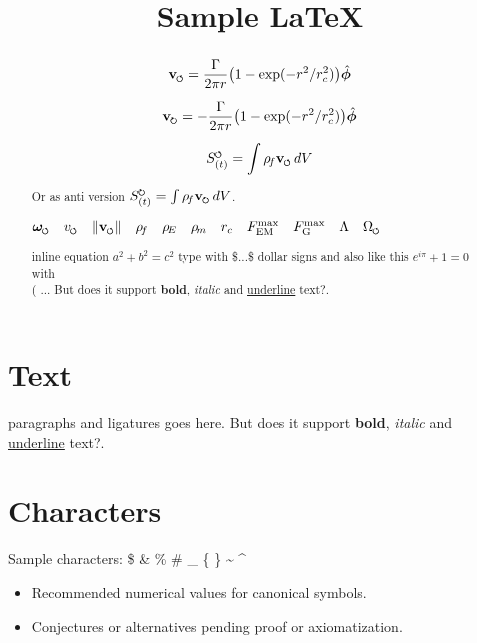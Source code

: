 \documentclass{article}
\title{Sample \LaTeX}
\newcommand{\swirlarrow}{%
    \mathchoice{\mkern-2mu\scriptstyle\boldsymbol{\circlearrowleft}}%
    {\mkern-2mu\scriptstyle\boldsymbol{\circlearrowleft}}%
    {\mkern-2mu\scriptscriptstyle\boldsymbol{\circlearrowleft}}%
    {\mkern-2mu\scriptscriptstyle\boldsymbol{\circlearrowleft}}%
}
\newcommand{\swirlarrowcw}{%
    \mathchoice{\mkern-2mu\scriptstyle\boldsymbol{\circlearrowright}}%
    {\mkern-2mu\scriptstyle\boldsymbol{\circlearrowright}}%
    {\mkern-2mu\scriptscriptstyle\boldsymbol{\circlearrowright}}%
    {\mkern-2mu\scriptscriptstyle\boldsymbol{\circlearrowright}}%
}
\newcommand{\vswirl}{\mathbf{v}_{\swirlarrow}}
\newcommand{\vswirlcw}{\mathbf{v}_{\swirlarrowcw}}
\newcommand{\SwirlClock}{S_{(t)}^{\swirlarrow}}
\newcommand{\SwirlClockcw}{S_{(t)}^{\swirlarrowcw}}
\newcommand{\omegas}{\boldsymbol{\omega}_{\swirlarrow}}  %
\newcommand{\vscore}{v_{\swirlarrow}}                    %
\newcommand{\vnorm}{\lVert \vswirl \rVert}               %
\newcommand{\rhof}{\rho_{\!f}}                           %
\newcommand{\rhoE}{\rho_{\!E}}                           %
\newcommand{\rhom}{\rho_{\!m}}                           %
\newcommand{\rc}{r_c}                                    %
\newcommand{\FmaxEM}{F_{\mathrm{EM}}^{\max}}             %
\newcommand{\FmaxG}{F_{\mathrm{G}}^{\max}}               %
\newcommand{\Lam}{\Lambda}                               %
\newcommand{\Om}{\Omega_{\swirlarrow}}                   %
\begin{document}
    \maketitle

    \begin{abstract}

        \begin{equation}
            \vswirl = \frac{\Gamma}{2\pi r}\bigl(1-\exp(-r^2/\rc^2)\bigr)\hat{\bm{\phi}}
        \end{equation}

        \[\vswirlcw = -\frac{\Gamma}{2\pi r}\bigl(1-\exp(-r^2/\rc^2)\bigr)\hat{\bm{\phi}}\]


        \begin{equation}
            \SwirlClock = \int \rhof \vswirl \, dV
        \end{equation}

        Or as anti version \(\SwirlClockcw = \int \rhof \vswirlcw \, dV\).

        $\omegas\quad \vscore\quad \vnorm\quad \rhof\quad \rhoE\quad \rhom\quad \rc\quad \FmaxEM\quad \FmaxG\quad \Lam\quad \Om$

        inline equation $a^2 + b^2 = c^2$ type with \$...\$ dollar signs
        and also like this \(e^{i\pi} + 1 = 0\) with \\( ... \)        But does it support \textbf{bold}, \textit{italic} and \underline{underline} text?.
    \end{abstract}

    \section{Text}
    paragraphs and ligatures goes here.
        But does it support \textbf{bold}, \textit{italic} and \underline{underline} text?.


    \section{Characters}
    Sample characters:
    \$ \& \% \# \_ \{ \} \~{} \^{}

\begin{itemize}
\item Recommended numerical values for canonical symbols.
\item Conjectures or alternatives pending proof or axiomatization.
\end{itemize}
\end{document}
